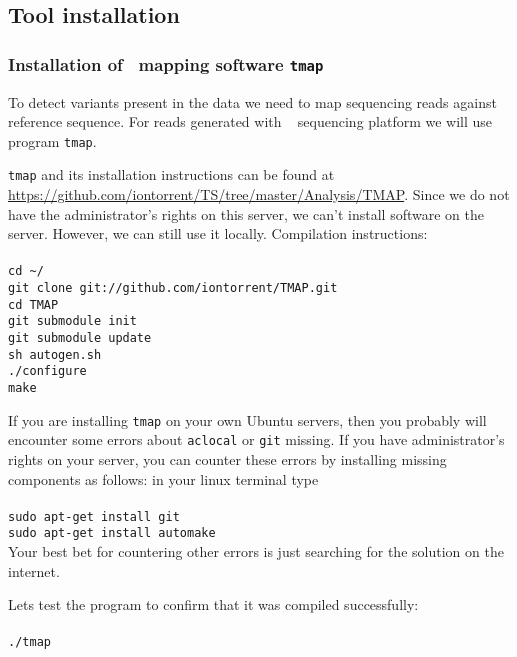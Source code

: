 \subsection{Tool installation}
\subsubsection{Installation of \IonTorrent~mapping software \texttt{tmap}}
To detect variants present in the data we need to map sequencing
reads against reference sequence. For reads generated with \IonTorrent~
sequencing platform we will use program \texttt{tmap}.

\texttt{tmap} and its installation instructions can
be found at \url{https://github.com/iontorrent/TS/tree/master/Analysis/TMAP}.
Since we do not have the administrator's rights on this server, we can't install
software on the server. However, we can still use it locally.
Compilation instructions:\\~\\
\texttt{cd \textasciitilde/\progDir}\\
\texttt{git clone git://github.com/iontorrent/TMAP.git}\\
\texttt{cd TMAP}\\
\texttt{git submodule init}\\
\texttt{git submodule update}\\
\texttt{sh autogen.sh}\\
\texttt{./configure}\\
\texttt{make}\\

\begin{framed}
If you are installing \texttt{tmap} on your own Ubuntu servers, then you probably will encounter
some errors about \texttt{aclocal} or \texttt{git} missing. If you have administrator's rights
on your server, you can counter these errors by installing missing components as follows:
in your linux terminal type\\~\\
\texttt{sudo apt-get install git}\\
\texttt{sudo apt-get install automake}\\

Your best bet for countering other errors is just searching for the solution on the internet.
\end{framed}
Lets test the program to confirm that it was compiled successfully:\\~\\
\texttt{./tmap}\\


